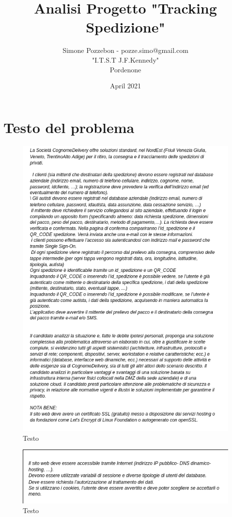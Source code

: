 \documentclass[a4paper, 12pt]{report}
\title{Analisi Progetto "Tracking Spedizione"}
\author{Simone Pozzebon - pozze.simo@gmail.com \\"I.T.S.T J.F.Kennedy" \\ Pordenone }
\date{April 2021}
\begin{document}
\maketitle
\newpage
\tableofcontents
\newpage

\section{Testo del problema}
\begin{figure}[H]
    \centering
    \includegraphics[scale=0.5]{img/testo1.png}
    \caption{Testo}
    \label{fig:my_label}
\end{figure}
\begin{figure}[H]
    \centering
    \includegraphics[scale=0.5]{img/testo2.png}
    \caption{Testo}
    \label{fig:my_label}
\end{figure}
\newpage
\end{document}
